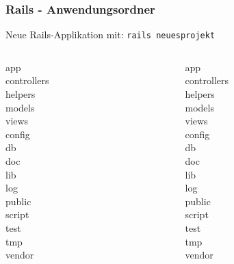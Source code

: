 \begin{frame}
  \frametitle{Rails - Anwendungsordner}
  \begin{center}
    Neue Rails-Applikation mit: {\tt rails neuesprojekt}
    \pause
    \small \tt
    \begin{columns}[t]
      \begin{column}{5cm}
        app \\
        \enskip controllers \\
        \enskip helpers \\
        \enskip models \\
        \enskip views \\
        config \\
        db \\
        doc \\
        lib \\
        log \\
        public \\
        script \\
        test \\
        tmp \\
        vendor
      \end{column}
      \pause
      \begin{column}{5cm}
        app \\
        \enskip controllers \\
        \enskip helpers \\
        \enskip models \\
        \enskip views \\
        \pause
        config \\
        \pause
        {\color{gray}db} \\
        {\color{lightgray}doc} \\
        {\color{lightgray}lib} \\
        {\color{gray}log} \\
        public \\
        \pause
        script \\
        {\color{lightgray}test} \\
        {\color{lightgray}tmp} \\
        {\color{lightgray}vendor}
      \end{column}
    \end{columns}
  \end{center}
\end{frame}

